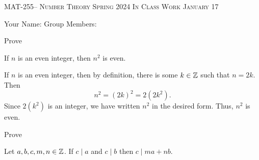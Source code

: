 \documentclass[handout]{ximera}
\date{January 17, 2024}
\begin{document}
\handoutAbstract
\maketitle
    \begin{center}%
        {\large \scshape MAT-255-- Number Theory \hfill Spring 2024 \hfill In Class Work January 17}%
    
        {\large
        Your Name: \hrulefill \quad Group Members:\hrulefill \quad \hrulefill
	    \par}%
  \end{center}%


\begin{br}
    Prove
        \begin{thm*}
            If $n$ is an even integer, then $n^2$ is even.
        \end{thm*}

        \begin{solution}
            If $n$ is an even integer, then by definition, there is some $k\in\mathbb Z$ such that $n=2k$. Then \[n^2=(2k)^2=2(2k^2).\] Since $2(k^2)$ is an integer, we have written $n^2$ in the desired form. Thus, $n^2$ is even.
        \end{solution}
\end{br}
\else
\fi


\begin{br}
    Prove
        \begin{thm*}
            Let $a,b,c,m,n\in\mathbb Z$.
            If $c\mid a$ and $c\mid b$ then $c\mid ma+nb$.
        \end{thm*}
\end{br}
\end{document}
